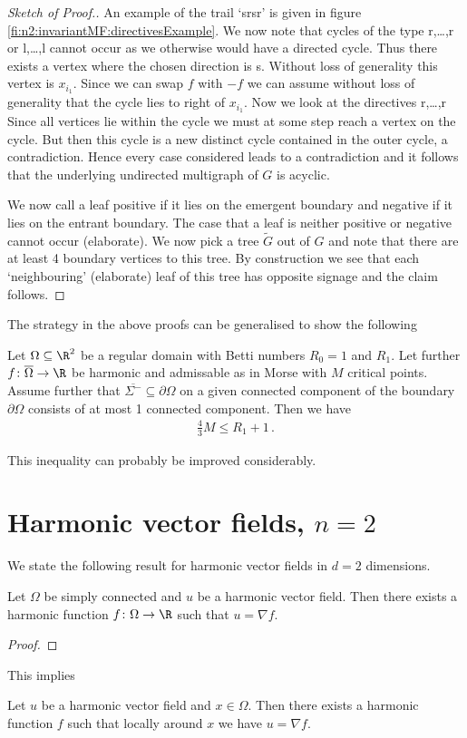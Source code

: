 \begin{proof}[Sketch of Proof.]
  An example of the trail `srsr' is given in figure \ref{fi:n2:invariantMF:directivesExample}.
  We now note that cycles of the type r,\dots,r or l,\dots,l
  cannot occur as we otherwise would have a directed cycle. Thus there exists a vertex where the chosen direction is s. 
  Without loss of generality this vertex is $x_{i_1}$.
  Since we can swap $f$ with $-f$ we can assume without loss of generality that the cycle lies to right of $x_{i_1}$.
  Now we look at the directives r,\dots,r
  Since all vertices lie within the cycle we must at some step reach a vertex on the cycle. But then this cycle is a new distinct cycle
  contained in the outer cycle, a contradiction.
  Hence every case considered leads to a contradiction and it follows that the underlying undirected multigraph of $G$
  is acyclic.
  
  We now call a leaf positive if it lies on the emergent boundary and
  negative if it lies on the entrant boundary. The case that a leaf is neither positive or negative cannot occur (elaborate).
  We now pick a tree $\widetilde{G}$ out of $G$ and note that
  there are at least 4 boundary vertices to this tree.
  By construction we see that each `neighbouring' (elaborate) leaf of this tree
  has opposite signage and the claim follows.
\end{proof} 

The strategy in the above proofs can be generalised to show the following
\begin{conjecture}
  Let $\Omega\subseteq\R^2$ be a regular domain with Betti numbers $R_0=1$ and $R_1$.
  Let further $f\colon\overline{\Omega}\to\R$ be harmonic and admissable 
  as in Morse with $M$ critical points. Assume further that 
  $\overline{\Sigma^-}\subseteq\partial\Omega$ on a given connected component 
  of the boundary $\partial\Omega$
  consists of at most 1 connected component. Then we have
  \begin{align*}
    \frac{4}{3}M\leq R_1+1\,.
  \end{align*}
\end{conjecture}
This inequality can probably be improved considerably.

\newpage

\section{Harmonic vector fields, $n=2$}

We state the following result for harmonic vector fields in $d=2$ dimensions.
\begin{proposition}
  Let $\Omega$ be simply connected and $u$ be a harmonic vector field. Then there exists
  a harmonic function $f\colon\Omega\to\R$ such that $u=\nabla f$.
\end{proposition}
\begin{proof}
\end{proof}
This implies
\begin{corollary}
  Let $u$ be a harmonic vector field and $x\in\Omega$. Then there exists a harmonic function $f$ such
  that locally around $x$ we have $u=\nabla f$.
\end{corollary}

